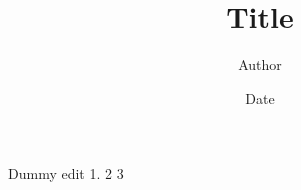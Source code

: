 \documentclass[12pt]{article}
\title{Title}
\author{Author}
\date{Date}
\begin{document}
\maketitle

Dummy edit 1. 2 3









\end{document}
